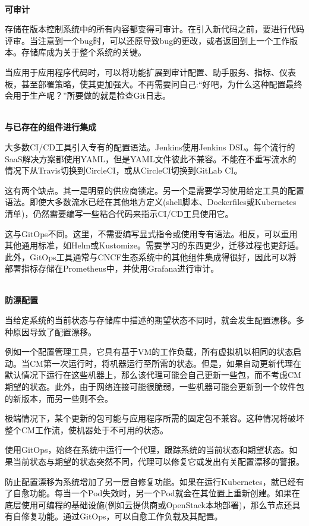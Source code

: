 \hspace*{\fill} \\ %
\noindent
\textbf{可审计}

存储在版本控制系统中的所有内容都变得可审计。在引入新代码之前，要进行代码评审。当注意到一个bug时，可以还原导致bug的更改，或者返回到上一个工作版本。存储库成为关于整个系统的关键。

当应用于应用程序代码时，可以将功能扩展到审计配置、助手服务、指标、仪表板，甚至部署策略，使其更加强大。不再需要问自己:“好吧，为什么这种配置最终会用于生产呢？”所要做的就是检查Git日志。

\hspace*{\fill} \\ %
\noindent
\textbf{与已存在的组件进行集成}

大多数CI/CD工具引入专有的配置语法。Jenkins使用Jenkins DSL。每个流行的SaaS解决方案都使用YAML，但是YAML文件彼此不兼容。不能在不重写流水的情况下从Travis切换到CircleCI，或从CircleCI切换到GitLab CI。

这有两个缺点。其一是明显的供应商锁定。另一个是需要学习使用给定工具的配置语法。即使大多数流水已经在其他地方定义(shell脚本、Dockerfiles或Kubernetes清单)，仍然需要编写一些粘合代码来指示CI/CD工具使用它。

这与GitOps不同。这里，不需要编写显式指令或使用专有语法。相反，可以重用其他通用标准，如Helm或Kustomize。需要学习的东西更少，迁移过程也更舒适。此外，GitOps工具通常与CNCF生态系统中的其他组件集成得很好，因此可以将部署指标存储在Prometheus中，并使用Grafana进行审计。

\hspace*{\fill} \\ %
\noindent
\textbf{防漂配置}

当给定系统的当前状态与存储库中描述的期望状态不同时，就会发生配置漂移。多种原因导致了配置漂移。

例如一个配置管理工具，它具有基于VM的工作负载，所有虚拟机以相同的状态启动。当CM第一次运行时，将机器运行至所需的状态。但是，如果自动更新代理在默认情况下运行在这些机器上，那么该代理可能会自己更新一些包，而不考虑CM期望的状态。此外，由于网络连接可能很脆弱，一些机器可能会更新到一个软件包的新版本，而另一些则不会。

极端情况下，某个更新的包可能与应用程序所需的固定包不兼容。这种情况将破坏整个CM工作流，使机器处于不可用的状态。

使用GitOps，始终在系统中运行一个代理，跟踪系统的当前状态和期望状态。如果当前状态与期望的状态突然不同，代理可以修复它或发出有关配置漂移的警报。

防止配置漂移为系统增加了另一层自修复功能。如果在运行Kubernetes，就已经有了自愈功能。每当一个Pod失效时，另一个Pod就会在其位置上重新创建。如果在底层使用可编程的基础设施(例如云提供商或OpenStack本地部署)，那么节点还具有自修复功能。通过GitOps，可以自愈工作负载及其配置。

